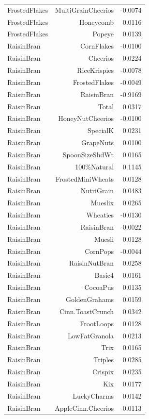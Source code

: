 \begin{longtable}{@{}lrr@{}}
FrostedFlakes & MultiGrainCheerios & -0.0074 \\
FrostedFlakes & Honeycomb & 0.0116 \\
FrostedFlakes & Popeye & 0.0139 \\
RaisinBran & CornFlakes & -0.0100 \\
RaisinBran & Cheerios & -0.0224 \\
RaisinBran & RiceKrispies & -0.0078 \\
RaisinBran & FrostedFlakes & -0.0049 \\
RaisinBran & RaisinBran & -0.9169 \\
RaisinBran & Total & 0.0317 \\
RaisinBran & HoneyNutCheerios & -0.0100 \\
RaisinBran & SpecialK & 0.0231 \\
RaisinBran & GrapeNuts & 0.0100 \\
RaisinBran & SpoonSizeShdWt & 0.0165 \\
RaisinBran & 100\%Natural & 0.1145 \\
RaisinBran & FrostedMiniWheats & 0.0128 \\
RaisinBran & NutriGrain & 0.0483 \\
RaisinBran & Mueslix & 0.0265 \\
RaisinBran & Wheaties & -0.0130 \\
RaisinBran & RaisinBran & -0.0022 \\
RaisinBran & Muesli & 0.0128 \\
RaisinBran & CornPops & -0.0044 \\
RaisinBran & RaisinNutBran & 0.0258 \\
RaisinBran & Basic4 & 0.0161 \\
RaisinBran & CocoaPus & 0.0135 \\
RaisinBran & GoldenGrahams & 0.0159 \\
RaisinBran & Cinn.ToastCrunch & 0.0342 \\
RaisinBran & FrootLoops & 0.0128 \\
RaisinBran & LowFatGranola & 0.0213 \\
RaisinBran & Trix & 0.0165 \\
RaisinBran & Triples & 0.0285 \\
RaisinBran & Crispix & 0.0235 \\
RaisinBran & Kix & 0.0177 \\
RaisinBran & LuckyCharms & 0.0142 \\
RaisinBran & AppleCinn.Cheerios & -0.0113 \\

\end{longtable}
